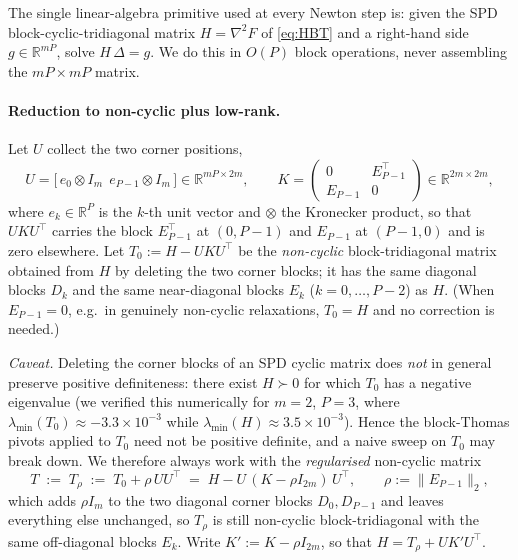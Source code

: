 \documentclass{amsart}
\newcommand{\R}{\mathbb{R}}
\begin{document}
The single linear-algebra primitive used at every Newton step is: given the SPD
block-cyclic-tridiagonal matrix $H=\nabla^2F$ of \eqref{eq:HBT} and a right-hand
side $g\in\R^{mP}$, solve $H\,\Delta=g$. We do this in $O(P)$ block operations,
never assembling the $mP\times mP$ matrix.

\paragraph{Reduction to non-cyclic plus low-rank.}
Let $U$ collect the two corner positions,
\begin{equation}\label{eq:UKV}
  U=\big[\,e_{0}\otimes I_m\ \ e_{P-1}\otimes I_m\,\big]\in\R^{mP\times2m},
  \qquad
  K=\begin{pmatrix}0 & E_{P-1}^{\!\top}\\ E_{P-1} & 0\end{pmatrix}\in\R^{2m\times2m},
\end{equation}
where $e_k\in\R^{P}$ is the $k$-th unit vector and $\otimes$ the Kronecker product,
so that $UKU^{\!\top}$ carries the block $E_{P-1}^{\!\top}$ at $(0,P-1)$ and $E_{P-1}$
at $(P-1,0)$ and is zero elsewhere. Let $T_0:=H-UKU^{\!\top}$ be the \emph{non-cyclic}
block-tridiagonal matrix obtained from $H$ by deleting the two corner blocks; it has
the same diagonal blocks $D_k$ and the same near-diagonal blocks $E_k$
($k=0,\dots,P-2$) as $H$. (When $E_{P-1}=0$, e.g.\ in genuinely non-cyclic
relaxations, $T_0=H$ and no correction is needed.)

\emph{Caveat.} Deleting the corner blocks of an SPD cyclic matrix does \emph{not} in
general preserve positive definiteness: there exist $H\succ0$ for which $T_0$ has a
negative eigenvalue (we verified this numerically for $m=2$, $P=3$, where
$\lambda_{\min}(T_0)\approx-3.3\times10^{-3}$ while $\lambda_{\min}(H)\approx
3.5\times10^{-3}$). Hence the block-Thomas pivots applied to $T_0$ need not be
positive definite, and a naive sweep on $T_0$ may break down. We therefore always
work with the \emph{regularised} non-cyclic matrix
\begin{equation}\label{eq:Trho}
  T \;:=\; T_\rho \;:=\; T_0+\rho\,UU^{\!\top}
        \;=\; H - U\,(K-\rho I_{2m})\,U^{\!\top},
  \qquad \rho:=\|E_{P-1}\|_2,
\end{equation}
which adds $\rho I_m$ to the two diagonal corner blocks $D_0,D_{P-1}$ and leaves
everything else unchanged, so $T_\rho$ is still non-cyclic block-tridiagonal with the
same off-diagonal blocks $E_k$. Write $K':=K-\rho I_{2m}$, so that
$H=T_\rho+UK'U^{\!\top}$.
\end{document}
